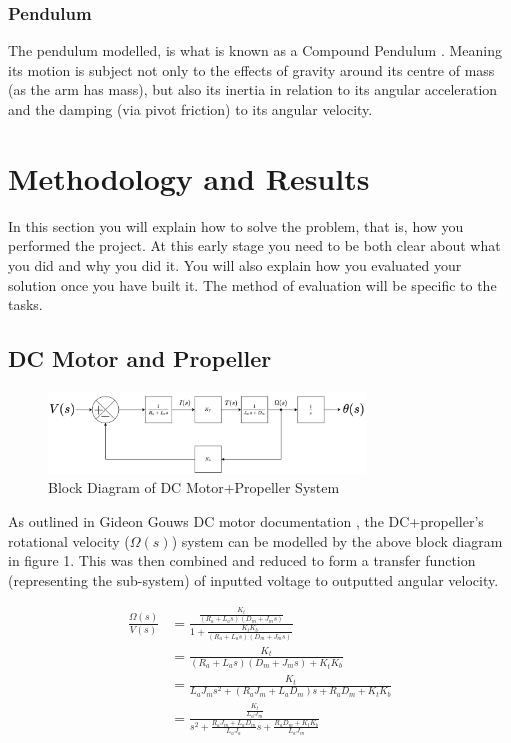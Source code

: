 \documentclass[a4paper,11pt]{article}
\begin{document}
\subsubsection*{Pendulum}
The pendulum modelled, is what is known as a Compound Pendulum \cite{pen}. Meaning its motion is subject not only to the effects of gravity around its centre of mass (as the arm has mass), but also its inertia in relation to its angular acceleration and the damping (via pivot friction) to its angular velocity. 

\newpage
\section{Methodology and Results}
In this section you will explain how to solve the problem, that is, how you performed the project. At this early stage you need to be both clear about what you did and why you did it. You will also explain how you evaluated your solution once you have built it. The method of evaluation will be specific to the tasks. 
\subsection{DC Motor and Propeller}
\begin{figure}[h]
        \centering
        \includegraphics[width=0.75\textwidth]{inc/motor_diagram.png}
        \caption{Block Diagram of DC Motor+Propeller System}
        \label{}
\end{figure}

As outlined in Gideon Gouws DC motor documentation \cite{dcmotors}, the DC+propeller's rotational velocity ($\Omega(s)$) system can be modelled by the above block diagram in figure 1. This was then combined and reduced to form a transfer function (representing the sub-system) of inputted voltage to outputted angular velocity.

\begin{align*}
        \frac{\Omega(s)}{V(s)} &= \frac{\frac{K_t}{(R_a+L_{a}s)(D_m+J_{m}s)}}{1+\frac{K_tK_b}{(R_a+L_{a}s)(D_m+J_{m}s)}} \\
                               &= \frac{K_t}{(R_a + L_{a}s)(D_m+J_{m}s) + K_tK_b} \\
                               &= \frac{K_t}{L_aJ_{m}s^{2} + (R_{a}J_{m} + L_aD_{m})s + R_{a}D_{m} + K_tK_b } \\
                               &= \frac{\frac{K_t}{L_aJ_m}}{s^2 + \frac{R_{a}J_{m} + L_{a}D_{m}}{L_{a}J_{a}}s + \frac{R_aD_m + K_tK_b}{L_aJ_m}}
\end{align*}
\end{document}
